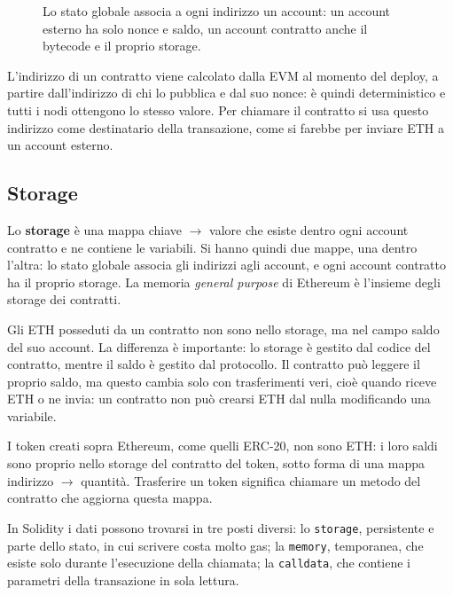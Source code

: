 \documentclass[a4paper, 11pt, oneside]{book}
\newcommand{\cod}[1]{\texttt{#1}} %
\begin{document}
	\begin{figure}[H]
		\centering
		
		\caption{Lo stato globale associa a ogni indirizzo un account: un account esterno
			ha solo nonce e saldo, un account contratto anche il bytecode e il proprio
			storage.}
		\label{fig:stato-account}
	\end{figure}

	L'indirizzo di un contratto viene calcolato dalla EVM al momento del deploy, a
	partire dall'indirizzo di chi lo pubblica e dal suo nonce: è quindi deterministico e
	tutti i nodi ottengono lo stesso valore. Per chiamare il contratto si usa questo
	indirizzo come destinatario della transazione, come si farebbe per inviare ETH a un
	account esterno.

	\subsection{Storage}
	Lo \textbf{storage} è una mappa chiave $\rightarrow$ valore che esiste dentro ogni
	account contratto e ne contiene le variabili. Si hanno quindi due mappe, una dentro
	l'altra: lo stato globale associa gli indirizzi agli account, e ogni account contratto
	ha il proprio storage. La memoria \textit{general purpose} di Ethereum è l'insieme
	degli storage dei contratti.

	Gli ETH posseduti da un contratto non sono nello storage, ma nel campo saldo del suo
	account. La differenza è importante: lo storage è gestito dal codice del contratto,
	mentre il saldo è gestito dal protocollo. Il contratto può leggere il proprio saldo,
	ma questo cambia solo con trasferimenti veri, cioè quando riceve ETH o ne invia: un
	contratto non può crearsi ETH dal nulla modificando una variabile.

	\begin{nota}
		I token creati sopra Ethereum, come quelli ERC-20, non sono ETH: i loro saldi sono
		proprio nello storage del contratto del token, sotto forma di una mappa
		indirizzo $\rightarrow$ quantità. Trasferire un token significa chiamare un metodo
		del contratto che aggiorna questa mappa.
	\end{nota}

	\begin{nota}
		In Solidity i dati possono trovarsi in tre posti diversi: lo \cod{storage},
		persistente e parte dello stato, in cui scrivere costa molto gas; la \cod{memory},
		temporanea, che esiste solo durante l'esecuzione della chiamata; la
		\cod{calldata}, che contiene i parametri della transazione in sola lettura.
	\end{nota}
\end{document}
